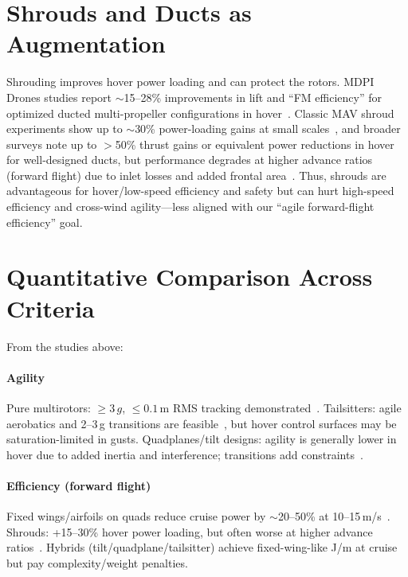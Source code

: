 \section{Shrouds and Ducts as Augmentation}

Shrouding improves hover power loading and can protect the rotors.
MDPI Drones studies report $\sim$15--28\% improvements in lift and ``FM efficiency'' for optimized ducted multi-propeller configurations in hover~\cite{Li2021}.
Classic MAV shroud experiments show up to $\sim$30\% power-loading gains at small scales~\cite{Hrishikeshavan2014}, and broader surveys note up to $>$50\% thrust gains or equivalent power reductions in hover for well-designed ducts, but performance degrades at higher advance ratios (forward flight) due to inlet losses and added frontal area~\cite{Chew2021,Pereira2008}.
Thus, shrouds are advantageous for hover/low-speed efficiency and safety but can hurt high-speed efficiency and cross-wind agility---less aligned with our ``agile forward-flight efficiency'' goal.


\section{Quantitative Comparison Across Criteria}

From the studies above:

\paragraph{Agility}
Pure multirotors: $\geq 3\,g$, $\leq 0.1\,\mathrm{m}$ RMS tracking demonstrated~\cite{Tal2018,Foehn2022}.
Tailsitters: agile aerobatics and 2--3\,g transitions are feasible~\cite{Lu2022,Tal2022Global}, but hover control surfaces may be saturation-limited in gusts.
Quadplanes/tilt designs: agility is generally lower in hover due to added inertia and interference; transitions add constraints~\cite{Okulski2022,Misra2022}.

\paragraph{Efficiency (forward flight)}
Fixed wings/airfoils on quads reduce cruise power by $\sim$20--50\% at 10--15\,m/s~\cite{Dawkins2018,Xiao2020,Freitas2025}.
Shrouds: +15--30\% hover power loading, but often worse at higher advance ratios~\cite{Li2021,Hrishikeshavan2014,Chew2021}.
Hybrids (tilt/quadplane/tailsitter) achieve fixed-wing-like J/m at cruise but pay complexity/weight penalties.


